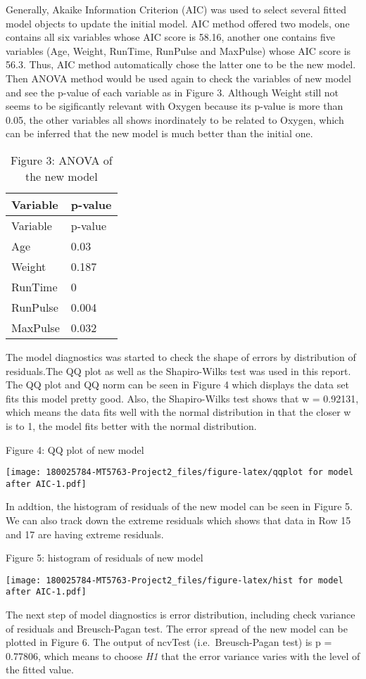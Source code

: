 \documentclass[]{article}
\begin{document}
Generally, Akaike Information Criterion (AIC) was used to select several
fitted model objects to update the initial model. AIC method offered two
models, one contains all six variables whose AIC score is 58.16, another
one contains five variables (Age, Weight, RunTime, RunPulse and
MaxPulse) whose AIC score is 56.3. Thus, AIC method automatically chose
the latter one to be the new model. Then ANOVA method would be used
again to check the variables of new model and see the p-value of each
variable as in Figure 3. Although Weight still not seems to be
sigificantly relevant with Oxygen because its p-value is more than 0.05,
the other variables all shows inordinately to be related to Oxygen,
which can be inferred that the new model is much better than the initial
one.

\begin{longtable}[]{@{}ll@{}}
\caption{Figure 3: ANOVA of the new model}\tabularnewline
\toprule
Variable & p-value\tabularnewline
\midrule
\endfirsthead
\toprule
Variable & p-value\tabularnewline
\midrule
\endhead
Age & 0.03\tabularnewline
Weight & 0.187\tabularnewline
RunTime & 0\tabularnewline
RunPulse & 0.004\tabularnewline
MaxPulse & 0.032\tabularnewline
\bottomrule
\end{longtable}

The model diagnostics was started to check the shape of errors by
distribution of residuals.The QQ plot as well as the Shapiro-Wilks test
was used in this report. The QQ plot and QQ norm can be seen in Figure 4
which displays the data set fits this model pretty good. Also, the
Shapiro-Wilks test shows that w = 0.92131, which means the data fits
well with the normal distribution in that the closer w is to 1, the
model fits better with the normal distribution.

Figure 4: QQ plot of new model

\texttt{[image: 180025784-MT5763-Project2\_files/figure-latex/qqplot for model after AIC-1.pdf]}

In addtion, the histogram of residuals of the new model can be seen in
Figure 5. We can also track down the extreme residuals which shows that
data in Row 15 and 17 are having extreme residuals.

Figure 5: histogram of residuals of new model

\texttt{[image: 180025784-MT5763-Project2\_files/figure-latex/hist for model after AIC-1.pdf]}

The next step of model diagnostics is error distribution, including
check variance of residuals and Breusch-Pagan test. The error spread of
the new model can be plotted in Figure 6. The output of ncvTest
(i.e.~Breusch-Pagan test) is p = 0.77806, which means to choose
\emph{H1} that the error variance varies with the level of the fitted
value.
\end{document}
